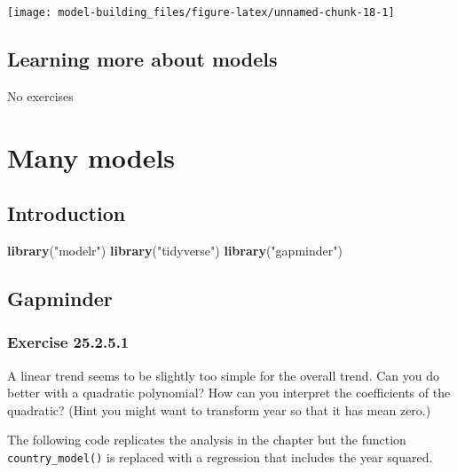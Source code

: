\documentclass[]{book}
\newenvironment{Shaded}{\begin{snugshade}}{\end{snugshade}}
\newcommand{\KeywordTok}[1]{\textcolor[rgb]{0.13,0.29,0.53}{\textbf{#1}}}
\newcommand{\NormalTok}[1]{#1}
\newcommand{\StringTok}[1]{\textcolor[rgb]{0.31,0.60,0.02}{#1}}
\theoremstyle{plain}
\theoremstyle{remark}
\begin{document}
\begin{center}\texttt{[image: model-building\_files/figure-latex/unnamed-chunk-18-1]} \end{center}

\hypertarget{learning-more-about-models}{%
\section{Learning more about models}\label{learning-more-about-models}}

No exercises

\hypertarget{many-models}{%
\chapter{Many models}\label{many-models}}

\hypertarget{introduction-16}{%
\section{Introduction}\label{introduction-16}}

\begin{Shaded}
\begin{Highlighting}[]
\KeywordTok{library}\NormalTok{(}\StringTok{"modelr"}\NormalTok{)}
\KeywordTok{library}\NormalTok{(}\StringTok{"tidyverse"}\NormalTok{)}
\KeywordTok{library}\NormalTok{(}\StringTok{"gapminder"}\NormalTok{)}
\end{Highlighting}
\end{Shaded}

\hypertarget{gapminder}{%
\section{Gapminder}\label{gapminder}}

\hypertarget{exercise-25.2.5.1}{%
\subsection*{\texorpdfstring{Exercise
{25.2.5.1}}{Exercise 25.2.5.1}}\label{exercise-25.2.5.1}}

A linear trend seems to be slightly too simple for the overall trend.
Can you do better with a quadratic polynomial? How can you interpret the
coefficients of the quadratic? (Hint you might want to transform year so
that it has mean zero.)

The following code replicates the analysis in the chapter but the
function \texttt{country\_model()} is replaced with a regression that
includes the year squared.
\end{document}
